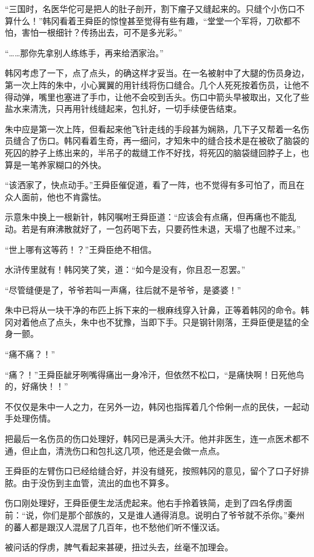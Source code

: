“三国时，名医华佗可是把人的肚子剖开，割下瘤子又缝起来的。只缝个小伤口不算什么！”韩冈看着王舜臣的惊惶甚至觉得有些有趣，“堂堂一个军将，刀砍都不怕，害怕一根细针？传扬出去，可不是多光彩。”

“……那你先拿别人练练手，再来给洒家治。”

韩冈考虑了一下，点了点头，的确这样才妥当。在一名被射中了大腿的伤员身边，第一次上阵的朱中，小心翼翼的用针线将伤口缝合。几个人死死按着伤员，让他不得动弹，嘴里也塞进了手巾，让他不会咬到舌头。伤口中箭头早被取出，又化了些盐水来清洗，只再用针线缝起来，包扎好，一切手续便告结束。

朱中应是第一次上阵，但看起来他飞针走线的手段甚为娴熟，几下子又帮着一名伤员缝合了伤口。韩冈看着生奇，再一细问，才知朱中的缝合技术是在被砍了脑袋的死囚的脖子上练出来的，半吊子的裁缝工作不好找，将死囚的脑袋缝回脖子上，也算是一笔养家糊口的外快。

“该洒家了，快点动手。”王舜臣催促道，看了一阵，也不觉得有多可怕了，而且在众人面前，他也不肯露怯。

示意朱中换上一根新针，韩冈嘱咐王舜臣道：“应该会有点痛，但再痛也不能乱动。若是有麻沸散就好了，一包药喝下去，只要药性未退，天塌了也醒不过来。”

“世上哪有这等药！？”王舜臣绝不相信。

水浒传里就有！韩冈笑了笑，道：“如今是没有，你且忍一忍罢。”

“尽管缝便是了，爷爷若叫一声痛，往后就不是爷爷，是婆婆！”

朱中已将从一块干净的布匹上拆下来的一根麻线穿入针鼻，正等着韩冈的命令。韩冈对着他点了点头，朱中也不犹豫，当即下手。只是钢针刚落，王舜臣便是猛的全身一颤。

“痛不痛？！”

“痛？！”王舜臣龇牙咧嘴得痛出一身冷汗，但依然不松口，“是痛快啊！日死他鸟的，好痛快！！”

不仅仅是朱中一人之力，在另外一边，韩冈也指挥着几个伶俐一点的民伕，一起动手处理伤情。

把最后一名伤员的伤口处理好，韩冈已是满头大汗。他并非医生，连一点医术都不通，但止血，清洗伤口和包扎这几项，他还是会做一点点。

王舜臣的左臂伤口已经给缝合好，并没有缝死，按照韩冈的意见，留个了口子好排脓。由于没伤到主血管，流出的血也不算多。

伤口刚处理好，王舜臣便生龙活虎起来。他右手拎着铁简，走到了四名俘虏面前：“说，你们是那个部族的，又是谁人通得消息。说明白了爷爷就不杀你。”秦州的蕃人都是跟汉人混居了几百年，也不愁他们听不懂汉话。

被问话的俘虏，脾气看起来甚硬，扭过头去，丝毫不加理会。

